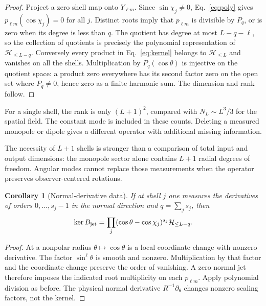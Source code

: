 \documentclass[aps,prd,reprint,amsmath,amssymb,nofootinbib,
longbibliography]{revtex4-2}
\newtheorem{corollary}[theorem]{Corollary}
\newcommand{\HH}{\mathcal H}
\begin{document}
\begin{proof}
Project a zero shell map onto $Y_{\ell m}$. Since $\sin\chi_j\ne0$,
Eq.~\eqref{eq:poly} gives $p_{\ell m}(\cos\chi_j)=0$ for all $j$.
Distinct roots imply that $p_{\ell m}$ is divisible by $P_q$, or is zero
when its degree is less than $q$. The quotient has degree at most
$L-q-\ell$, so the collection of quotients is precisely the polynomial
representation of $\HH_{\leq L-q}$. Conversely every product in
Eq.~\eqref{eq:kernel} belongs to $\HH_{\leq L}$ and vanishes on all the
shells. Multiplication by $P_q(\cos\theta)$ is injective on the quotient
space: a product zero everywhere has its second factor zero on the open
set where $P_q\ne0$, hence zero as a finite harmonic sum. The dimension
and rank follow.
\end{proof}

For a single shell, the rank is only $(L+1)^2$, compared with
$N_L\sim L^3/3$ for the spatial field. The constant mode is included in
these counts. Deleting a measured monopole or dipole gives a different
operator with additional missing information.

The necessity of $L+1$ shells is stronger than a comparison of total
input and output dimensions: the monopole sector alone contains $L+1$
radial degrees of freedom. Angular modes cannot replace those measurements
when the operator preserves observer-centered rotations.

\begin{corollary}[Normal-derivative data]
\label{cor:jets}
If at shell $j$ one measures the derivatives of orders
$0,\ldots,s_j-1$ in the normal direction and $q=\sum_j s_j$, then
\begin{equation}
 \ker B_{\rm jet}=
 \prod_j(\cos\theta-\cos\chi_j)^{s_j}\HH_{\leq L-q}.
 \label{eq:jets}
\end{equation}
\end{corollary}

\begin{proof}
At a nonpolar radius $\theta\mapsto\cos\theta$ is a local coordinate
change with nonzero derivative. The factor $\sin^\ell\theta$ is smooth
and nonzero. Multiplication by that factor and the coordinate change
preserve the order of vanishing. A zero normal jet therefore imposes
the indicated root multiplicity on each $p_{\ell m}$. Apply polynomial
division as before. The physical normal derivative $R^{-1}\partial_\theta$
changes nonzero scaling factors, not the kernel.
\end{proof}
\end{document}
